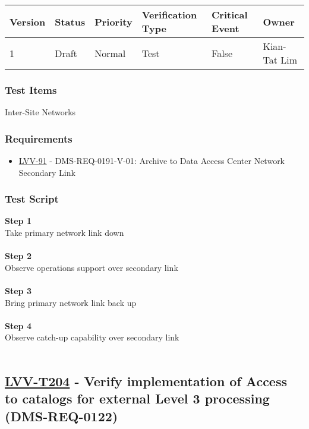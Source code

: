 \begin{longtable}[]{@{}llllll@{}}
\toprule
Version & Status & Priority & Verification Type & Critical Event &
Owner\tabularnewline
\midrule
\endhead
1 & Draft & Normal & Test & False & Kian-Tat Lim\tabularnewline
\bottomrule
\end{longtable}

\hypertarget{test-items-179}{%
\subsubsection{Test Items}\label{test-items-179}}

Inter-Site Networks~

\hypertarget{requirements-180}{%
\subsubsection{Requirements}\label{requirements-180}}

\begin{itemize}
\tightlist
\item
  \href{https://jira.lsstcorp.org/browse/LVV-91}{LVV-91} -
  DMS-REQ-0191-V-01: Archive to Data Access Center Network Secondary
  Link
\end{itemize}

\hypertarget{test-script-180}{%
\subsubsection{Test Script}\label{test-script-180}}

\textbf{Step 1}\\
Take primary network link down\\
~\\
\textbf{Step 2}\\
Observe operations support over secondary link\\
~\\
\textbf{Step 3}\\
Bring primary network link back up\\
~\\
\textbf{Step 4}\\
Observe catch-up capability over secondary link\\
~\\

\hypertarget{lvv-t204---verify-implementation-of-access-to-catalogs-for-external-level-3-processing-dms-req-0122}{%
\subsection{\texorpdfstring{\href{https://jira.lsstcorp.org/secure/Tests.jspa\#/testCase/LVV-T204}{LVV-T204}
- Verify implementation of Access to catalogs for external Level 3
processing
(DMS-REQ-0122)}{LVV-T204 - Verify implementation of Access to catalogs for external Level 3 processing (DMS-REQ-0122)}}\label{lvv-t204---verify-implementation-of-access-to-catalogs-for-external-level-3-processing-dms-req-0122}}

